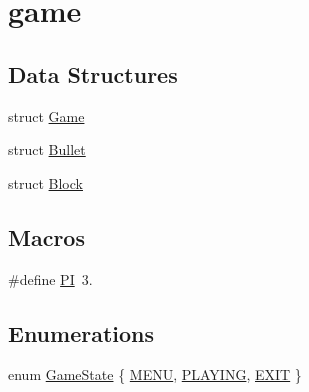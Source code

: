 \hypertarget{group__game}{}\section{game}
\label{group__game}
\subsection*{Data Structures}
\begin{DoxyCompactItemize}
\item 
struct \mbox{\hyperlink{struct_game}{Game}}
\item 
struct \mbox{\hyperlink{struct_bullet}{Bullet}}
\item 
struct \mbox{\hyperlink{struct_block}{Block}}
\end{DoxyCompactItemize}
\subsection*{Macros}
\begin{DoxyCompactItemize}
\item 
\#define \mbox{\hyperlink{group__game_ga598a3330b3c21701223ee0ca14316eca}{PI}}~3.
\end{DoxyCompactItemize}
\subsection*{Enumerations}
\begin{DoxyCompactItemize}
\item 
enum \mbox{\hyperlink{group__game_ga7899b65f1ea0f655e4bbf8d2a5714285}{Game\+State}} \{ \mbox{\hyperlink{group__game_gga7899b65f1ea0f655e4bbf8d2a5714285a4c40e60bc71a32b924ce1f08d57f9721}{M\+E\+NU}}, 
\mbox{\hyperlink{group__game_gga7899b65f1ea0f655e4bbf8d2a5714285af095245f5cebc27a97a124345269fed8}{P\+L\+A\+Y\+I\+NG}}, 
\mbox{\hyperlink{group__game_gga7899b65f1ea0f655e4bbf8d2a5714285a7a10b5d68d31711288e1fe0fa17dbf4f}{E\+X\+IT}}
 \}
\end{DoxyCompactItemize}
